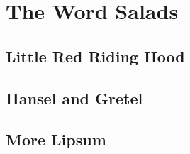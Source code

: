 \documentclass[oneside,11pt]{memoir} %
\begin{document}
%


\part{The Word Salads}


\chapter{Little Red Riding Hood}



\chapter{Hansel and Gretel}



\chapter{More Lipsum}

\end{document}
